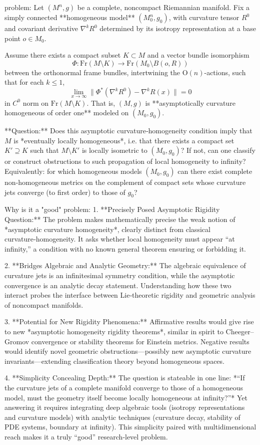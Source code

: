problem:  
Let \((M^n, g)\) be a complete, noncompact Riemannian manifold.  
Fix a simply connected **homogeneous model** \((M_0^n, g_0)\), with curvature tensor \(R^0\) and covariant derivative \(\nabla^k R^0\) determined by its isotropy representation at a base point \(o \in M_0\).  

Assume there exists a compact subset \(K \subset M\) and a vector bundle isomorphism  
\[
\Phi : \mathrm{Fr}(M\setminus K) \to \mathrm{Fr}(M_0\setminus B(o,R))
\]
between the orthonormal frame bundles, intertwining the \(\mathrm{O}(n)\)-actions, such that for each \(k \le 1\),
\[
\lim_{x\to\infty} \| \Phi^*(\nabla^k R^0) - \nabla^k R(x) \| = 0
\]
in \(C^0\) norm on \(\mathrm{Fr}(M\setminus K)\).  
That is, \((M,g)\) is **asymptotically curvature homogeneous of order one** modeled on \((M_0,g_0)\).

**Question:**  
Does this asymptotic curvature‑homogeneity condition imply that \(M\) is *eventually locally homogeneous*, i.e. that there exists a compact set \(K'\supseteq K\) such that \(M\setminus K'\) is locally isometric to \((M_0,g_0)\)?  
If not, can one classify or construct obstructions to such propagation of local homogeneity to infinity?  
Equivalently: for which homogeneous models \((M_0,g_0)\) can there exist complete non‑homogeneous metrics on the complement of compact sets whose curvature jets converge (to first order) to those of \(g_0\)?

Why is it a "good" problem:  
1. **Precisely Posed Asymptotic Rigidity Question:**  
   The problem makes mathematically precise the weak notion of *asymptotic curvature homogeneity*, clearly distinct from classical curvature‑homogeneity. It asks whether local homogeneity must appear “at infinity,” a condition with no known general theorem ensuring or forbidding it.

2. **Bridges Algebraic and Analytic Geometry:**  
   The algebraic equivalence of curvature jets is an infinitesimal symmetry condition, while the asymptotic convergence is an analytic decay statement. Understanding how these two interact probes the interface between Lie‑theoretic rigidity and geometric analysis of noncompact manifolds.

3. **Potential for New Rigidity Phenomena:**  
   Affirmative results would give rise to new *asymptotic homogeneity rigidity theorems*, similar in spirit to Cheeger–Gromov convergence or stability theorems for Einstein metrics. Negative results would identify novel geometric obstructions—possibly new asymptotic curvature invariants—extending classification theory beyond homogeneous spaces.

4. **Simplicity Concealing Depth:**  
   The question is stateable in one line:  
   *“If the curvature jets of a complete manifold converge to those of a homogeneous model, must the geometry itself become locally homogeneous at infinity?”*  
   Yet answering it requires integrating deep algebraic tools (isotropy representations and curvature models) with analytic techniques (curvature decay, stability of PDE systems, boundary at infinity). This simplicity paired with multidimensional reach makes it a truly “good” research‑level problem.